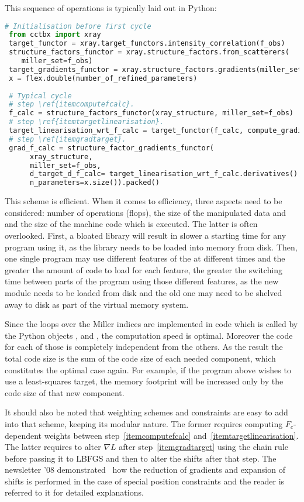 \documentclass[12pt]{article}
\begin{document}
This sequence of operations is typically laid out in Python:

 \begin{lstlisting}[language=Python]
 # Initialisation before first cycle
 from cctbx import xray
 target_functor = xray.target_functors.intensity_correlation(f_obs)
 structure_factors_functor = xray.structure_factors.from_scatterers(
 	miller_set=f_obs)
 target_gradients_functor = xray.structure_factors.gradients(miller_set=f_obs)
 x = flex.double(number_of_refined_parameters)
 
 # Typical cycle
 # step \ref{itemcomputefcalc}.
 f_calc = structure_factors_functor(xray_structure, miller_set=f_obs)
 # step \ref{itemtargetlinearisation}.
 target_linearisation_wrt_f_calc = target_functor(f_calc, compute_gradients=True)
 # step \ref{itemgradtarget}.
 grad_f_calc = structure_factor_gradients_functor(
      xray_structure,
      miller_set=f_obs,
      d_target_d_f_calc= target_linearisation_wrt_f_calc.derivatives(),
      n_parameters=x.size()).packed() 
 \end{lstlisting}
 
 This scheme is efficient. When it comes to efficiency, three aspects need to be considered:
 number of operations (flops), the size of the manipulated data and and the size of the machine code which is executed. The latter is often overlooked. First, a bloated library will result in slower a starting time for any program using it, as the library needs to be loaded into memory from disk. Then, one single program may use different features of the \cctbx at different times and the greater the amount of code to load for each feature, the greater the switching time between parts of the program using those different features, as the new module needs to be loaded from disk and the old one may need to be shelved away to disk as part of the virtual memory system.
 
 Since the loops over the Miller indices are implemented in \cpp code which is called by the Python objects ,  and , the computation speed is optimal. Moreover the \cpp code for each of those is completely independent from the others. As the result the total code size is the sum of the code size of each needed component, which constitutes the optimal case again. For example, if the program above wishes to use a least-squares target, the memory footprint will be increased only by the code size of that new component.
 
It should also be noted that weighting schemes and constraints are easy to add into that scheme, keeping its modular nature. The former requires computing $F_c$-dependent weights between step~\ref{itemcomputefcalc} and~\ref{itemtargetlinearisation}. The latter requires to alter $\nabla L$ after step~\ref{itemgradtarget} using the chain rule before passing it to LBFGS and then to alter the shifts after that step. The \cctbx newsletter '08 demonstrated~\cite{Bourhis:2008} how the reduction of gradients and expansion of shifts is performed in the case of special position constraints and the reader is referred to it for detailed explanations.
 
\end{document}
